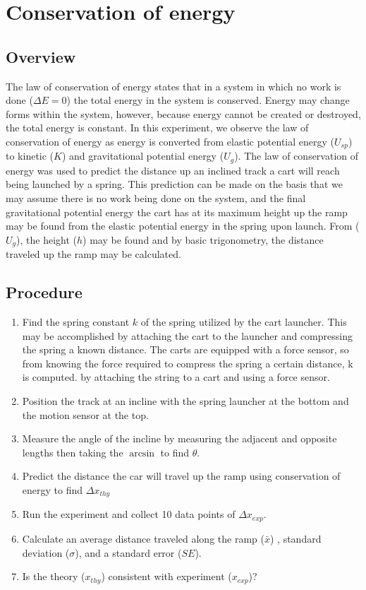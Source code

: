 \documentclass[11pt, letterpaper, includehead]{article}
\begin{document}
\section{Conservation of energy}
\subsection{Overview}
The law of conservation of energy states that in a system in which no work is done
($\Delta E = 0$) the total energy in the system is conserved. Energy may change forms 
within the system, however, because energy cannot be created or destroyed, the total energy is constant. In this experiment, we observe the law of conservation of energy as energy is 
converted from elastic potential energy ($U_{sp}$) to kinetic ($K$) and gravitational potential 
energy ($U_g$). The law of conservation of energy was used to predict the distance up an inclined track 
a cart will reach being launched by a spring. This prediction can be made on the basis that we may assume there
is no work being done on the system, and the final gravitational potential energy the cart has at its maximum height up the ramp 
may be found from the elastic potential energy in the spring upon launch. From ($U_g$), the height ($h$) may be found
and by basic trigonometry, the distance traveled up the ramp may be calculated.

\subsection{Procedure}
\begin{enumerate} 
  \item Find the spring constant $k$ of the spring utilized by the cart launcher. 
  This may be accomplished by attaching the cart to the launcher and compressing the 
  spring a known distance. The carts are equipped with a force sensor, so from knowing the force 
  required to compress the spring a certain distance, k is computed.
  by attaching the string to a cart and using a force sensor.
  \item Position the track at an incline with the spring launcher at the bottom 
        and the motion sensor at the top. 
  \item Measure the angle of the incline by measuring the adjacent and opposite lengths
  then taking the $\arcsin$ to find $\theta$.
  \item Predict the distance the car will travel up the ramp using conservation of energy to find $\Delta x_{thy}$
  \item Run the experiment and collect 10 data points of $\Delta x_{exp}$.
  \item Calculate an average distance traveled along the ramp ($\bar{x}$) , standard deviation 
  ($\sigma$), and a standard error ($SE$).
  \item Is the theory ($x_{thy}$) consistent with experiment ($x_{exp}$)?
\end{enumerate}
\end{document}
